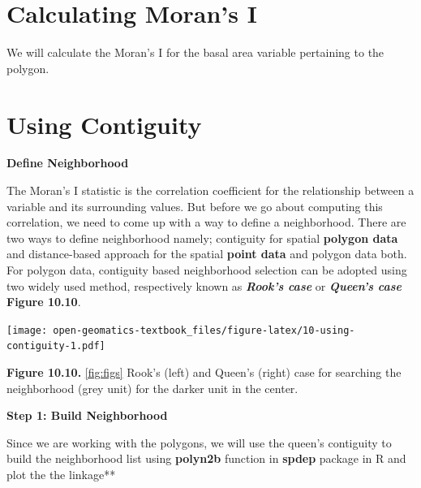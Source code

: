 \documentclass[
]{book}
\begin{document}
\hypertarget{calculating-morans-i}{%
\section*{Calculating Moran's I}\label{calculating-morans-i}}

We will calculate the Moran's I for the basal area variable pertaining to the polygon.

\hypertarget{using-contiguity}{%
\section*{Using Contiguity}\label{using-contiguity}}

\textbf{Define Neighborhood}

The Moran's I statistic is the correlation coefficient for the relationship between a variable and its surrounding values. But before we go about computing this correlation, we need to come up with a way to define a neighborhood. There are two ways to define neighborhood namely; contiguity for spatial \textbf{polygon data} and distance-based approach for the spatial \textbf{point data} and polygon data both. For polygon data, contiguity based neighborhood selection can be adopted using two widely used method, respectively known as \textbf{\emph{Rook's case}} or \textbf{\emph{Queen's case}} \textbf{Figure 10.10}.

\texttt{[image: open-geomatics-textbook\_files/figure-latex/10-using-contiguity-1.pdf]}

\textbf{Figure 10.10.} \ref{fig:figs} Rook's (left) and Queen's (right) case for searching the neighborhood (grey unit) for the darker unit in the center.

\textbf{Step 1: Build Neighborhood}

Since we are working with the polygons, we will use the queen's contiguity to build the neighborhood list using \textbf{polyn2b} function in \textbf{spdep} package in R and plot the the linkage**
\end{document}
